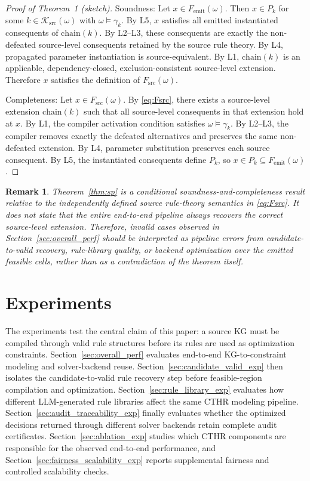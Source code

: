 ﻿\documentclass[a4paper,fleqn]{cas-dc}
\newtheorem{remark}{Remark}
\newcommand{\CTHR}{\textsc{CTHR}}
\begin{document}
\begin{proof}[Proof of Theorem~1 (sketch)]
Soundness: Let $x \in F_{\mathrm{emit}}(\omega)$. Then $x\in P_k$ for some $k\in\mathcal{K}_{\mathrm{src}}(\omega)$ with $\omega\models\gamma_k$. By L5, $x$ satisfies all emitted instantiated consequents of $\mathrm{chain}(k)$. By L2--L3, these consequents are exactly the non-defeated source-level consequents retained by the source rule theory. By L4, propagated parameter instantiation is source-equivalent. By L1, $\mathrm{chain}(k)$ is an applicable, dependency-closed, exclusion-consistent source-level extension. Therefore $x$ satisfies the definition of $F_{\mathrm{src}}(\omega)$.

Completeness: Let $x \in F_{\mathrm{src}}(\omega)$. By \eqref{eq:Fsrc}, there exists a source-level extension $\mathrm{chain}(k)$ such that all source-level consequents in that extension hold at $x$. By L1, the compiler activation condition satisfies $\omega\models\gamma_k$. By L2--L3, the compiler removes exactly the defeated alternatives and preserves the same non-defeated extension. By L4, parameter substitution preserves each source consequent. By L5, the instantiated consequents define $P_k$, so $x\in P_k\subseteq F_{\mathrm{emit}}(\omega)$.
\end{proof}

\begin{remark}
Theorem~\ref{thm:sp} is a conditional soundness-and-completeness result relative
to the independently defined source rule-theory semantics in \eqref{eq:Fsrc}.
It does not state that the entire end-to-end pipeline always recovers the
correct source-level extension. Therefore, invalid cases observed in
Section~\ref{sec:overall_perf} should be interpreted as pipeline errors from
candidate-to-valid recovery, rule-library quality, or backend optimization over
the emitted feasible cells, rather than as a contradiction of the theorem
itself.
\end{remark}

\section{Experiments}
\label{sec:exp}

The experiments test the central claim of this paper: a source KG must be
compiled through valid rule structures before its rules are used as optimization
constraints. Section~\ref{sec:overall_perf} evaluates end-to-end
KG-to-constraint modeling and solver-backend reuse. Section~\ref{sec:candidate_valid_exp}
then isolates the candidate-to-valid rule recovery step before feasible-region
compilation and optimization. Section~\ref{sec:rule_library_exp} evaluates how
different LLM-generated rule libraries affect the same \CTHR{} modeling
pipeline. Section~\ref{sec:audit_traceability_exp} finally evaluates whether
the optimized decisions returned through different solver backends retain
complete audit certificates. Section~\ref{sec:ablation_exp} studies which
\CTHR{} components are responsible for the observed end-to-end performance, and
Section~\ref{sec:fairness_scalability_exp} reports supplemental fairness and
controlled scalability checks.
\end{document}
